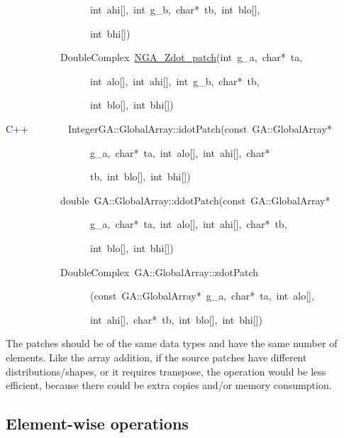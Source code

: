 \begin{lyxcode}
~~~~~~~~~~~~~~~~~int~ahi{[}{]},~int~g\_b,~char{*}~tb,~int~blo{[}{]},~

~~~~~~~~~~~~~~~~~int~bhi{[}{]})~

~~~~~~~~~~~DoubleComplex~\href{http://www.emsl.pnl.gov/docs/global/c_nga_ops.html\#ga_dot_patch}{NGA\_{}Zdot\_{}patch}(int~g\_a,~char{*}~ta,~

~~~~~~~~~~~~~~~~~int~alo{[}{]},~int~ahi{[}{]},~int~g\_b,~char{*}~tb,~

~~~~~~~~~~~~~~~~~int~blo{[}{]},~int~bhi{[}{]})



\textcolor{blue}{C++~}~~~~~~~IntegerGA::GlobalArray::idotPatch(const~GA::GlobalArray{*}

~~~~~~~~~~~~~~~~~g\_a,~char{*}~ta,~int~alo{[}{]},~int~ahi{[}{]},~char{*}~

~~~~~~~~~~~~~~~~~tb,~int~blo{[}{]},~int~bhi{[}{]})~

~~~~~~~~~~~double~GA::GlobalArray::ddotPatch(const~GA::GlobalArray{*}

~~~~~~~~~~~~~~~~~g\_a,~char{*}~ta,~int~alo{[}{]},~int~ahi{[}{]},~char{*}~tb,~

~~~~~~~~~~~~~~~~~int~blo{[}{]},~int~bhi{[}{]})~

~~~~~~~~~~~DoubleComplex~GA::GlobalArray::zdotPatch

~~~~~~~~~~~~~~~~~(const~GA::GlobalArray{*}~g\_a,~char{*}~ta,~int~alo{[}{]},~

~~~~~~~~~~~~~~~~~int~ahi{[}{]},~char{*}~tb,~int~blo{[}{]},~int~bhi{[}{]})
\end{lyxcode}
The patches should be of the same data types and have the same number
of elements. Like the array addition, if the source patches have different
distributions/shapes, or it requires transpose, the operation would
be less efficient, because there could be extra copies and/or memory
consumption. 


\subsection{Element-wise operations }

